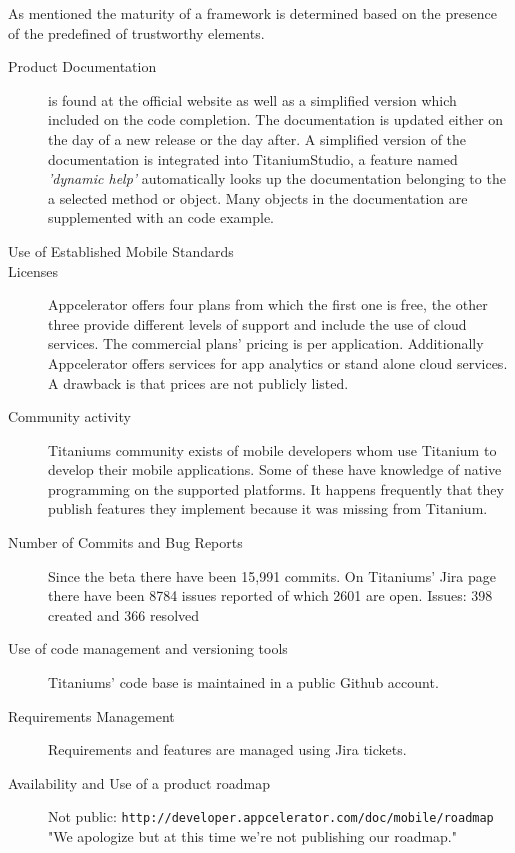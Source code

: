 As mentioned the maturity of a framework is determined based on the presence of the predefined of trustworthy elements.

\begin{description}
\item [Product Documentation] is found at the official website as well as a simplified version which included on the code completion. 
The documentation is updated either on the day of a new release or the day after. %
A simplified version of the documentation is integrated into TitaniumStudio, a feature named \emph{'dynamic help'} automatically looks up the documentation belonging to the a selected method or object.
Many objects in the documentation are supplemented with an code example.
\item [Use of Established Mobile Standards] 
\item [Licenses] Appcelerator offers four plans from which the first one is free, the other three provide different levels of support and include the use of cloud services. The commercial plans' pricing is per application. Additionally Appcelerator offers services for app analytics or stand alone cloud services. A drawback is that prices are not publicly listed.
\item [Community activity] Titaniums community exists of mobile developers whom use Titanium to develop their mobile applications. Some of these have knowledge of native programming on the supported platforms. It happens frequently that they publish features they implement because it was missing from Titanium. 
\item [Number of Commits and Bug Reports] Since the beta there have been 15,991 commits. %
On Titaniums' Jira page there have been 8784 issues reported of which 2601 are open.
Issues: 398 created and 366 resolved
\item [Use of code management and versioning tools] Titaniums' code base is maintained in a public Github account.%
\item [Requirements Management] Requirements and features are managed using Jira tickets.
\item [Availability and Use of a product roadmap] Not public:
\texttt{http://developer.appcelerator.com/doc/mobile/roadmap}
"We apologize but at this time we're not publishing our roadmap."
\end{description}

